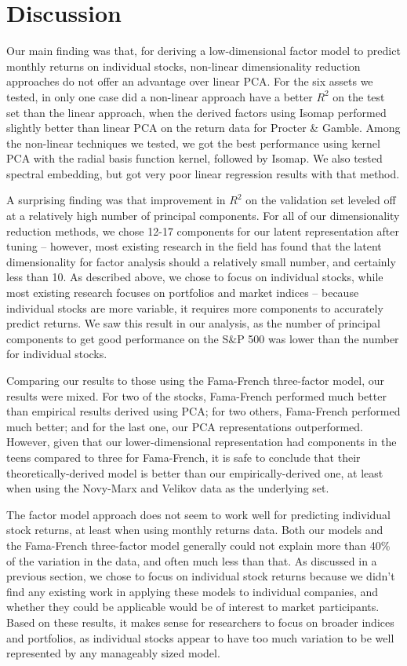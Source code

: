 \documentclass[a4paper]{article}
\begin{document}
    \section{Discussion}
    \par Our main finding was that, for deriving a low-dimensional factor model to predict monthly returns on individual stocks, non-linear dimensionality reduction approaches do not offer an advantage over linear PCA. For the six assets we tested, in only one case did a non-linear approach have a better $R^2$ on the test set than the linear approach, when the derived factors using Isomap performed slightly better than linear PCA on the return data for Procter \& Gamble. Among the non-linear techniques we tested, we got the best performance using kernel PCA with the radial basis function kernel, followed by Isomap. We also tested spectral embedding, but got very poor linear regression results with that method.
    \par A surprising finding was that improvement in $R^2$ on the validation set leveled off at a relatively high number of principal components. For all of our dimensionality reduction methods, we chose 12-17 components for our latent representation after tuning – however, most existing research in the field has found that the latent dimensionality for factor analysis should a relatively small number, and certainly less than 10. As described above, we chose to focus on individual stocks, while most existing research focuses on portfolios and market indices – because individual stocks are more variable, it requires more components to accurately predict returns. We saw this result in our analysis, as the number of principal components to get good performance on the S\&P 500 was lower than the number for individual stocks.
    \par Comparing our results to those using the Fama-French three-factor model, our results were mixed. For two of the stocks, Fama-French performed much better than empirical results derived using PCA; for two others, Fama-French performed much better; and for the last one, our PCA representations outperformed. However, given that our lower-dimensional representation had components in the teens compared to three for Fama-French, it is safe to conclude that their theoretically-derived model is better than our empirically-derived one, at least when using the Novy-Marx and Velikov data as the underlying set.
    \par The factor model approach does not seem to work well for predicting individual stock returns, at least when using monthly returns data. Both our models and the Fama-French three-factor model generally could not explain more than 40\% of the variation in the data, and often much less than that. As discussed in a previous section, we chose to focus on individual stock returns because we didn't find any existing work in applying these models to individual companies, and whether they could be applicable would be of interest to market participants. Based on these results, it makes sense for researchers to focus on broader indices and portfolios, as individual stocks appear to have too much variation to be well represented by any manageably sized model.
\end{document}
